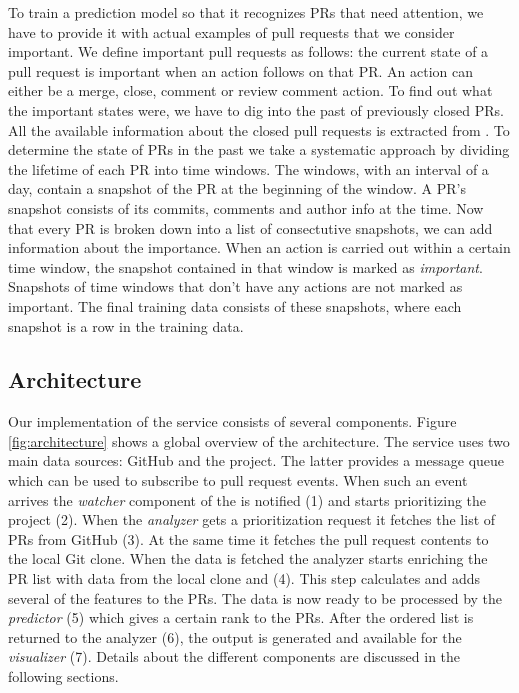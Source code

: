 To train a prediction model so that it recognizes PRs that need attention, we have to provide it with actual examples of pull requests that we consider important.
We define important pull requests as follows: the current state of a pull request is important when an action follows on that PR.
An action can either be a merge, close, comment or review comment action.
To find out what the important states were, we have to dig into the past of previously closed PRs.
All the available information about the closed pull requests is extracted from \ghtorrent.
To determine the state of PRs in the past we take a systematic approach by dividing the lifetime of each PR into time windows.
The windows, with an interval of a day, contain a snapshot of the PR at the beginning of the window.
A PR's snapshot consists of its commits, comments and author info at the time.
Now that every PR is broken down into a list of consectutive snapshots, we can add information about the importance.
When an action is carried out within a certain time window, the snapshot contained in that window is marked as \emph{important}.
Snapshots of time windows that don't have any actions are not marked as important.
The final training data consists of these snapshots, where each snapshot is a row in the training data.

\subsection{Architecture}
\label{sec:architecture}

Our implementation of the service consists of several components.
Figure \ref{fig:architecture} shows a global overview of the architecture.
The \prioritizer service uses two main data sources: GitHub and the \ghtorrent project.
The latter provides a message queue which can be used to subscribe to pull request events.
When such an event arrives the \emph{watcher} component of the \prioritizer is notified (1) and starts prioritizing the project (2).
When the \emph{analyzer} gets a prioritization request it fetches the list of PRs from GitHub (3).
At the same time it fetches the pull request contents to the local Git clone.
When the data is fetched the analyzer starts enriching the PR list with data from the local clone and \ghtorrent (4).
This step calculates and adds several of the features to the PRs.
The data is now ready to be processed by the \emph{predictor} (5) which gives a certain rank to the PRs.
After the ordered list is returned to the analyzer (6), the output is generated and available for the \emph{visualizer} (7).
Details about the different components are discussed in the following sections.

